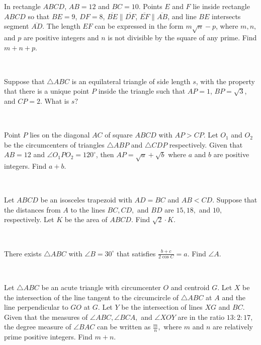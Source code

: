 \documentclass[mast]{lucky}
\begin{document}
\begin{req}[AIME I 2011/2]{2}
In rectangle $ABCD$, $AB=12$ and $BC=10$. Points $E$ and $F$ lie inside rectangle $ABCD$ so that $BE=9$, $DF=8$, $\overline{BE} \parallel \overline{DF}$, $\overline{EF} \parallel \overline{AB}$, and line $BE$ intersects segment $\overline{AD}$. The length $EF$ can be expressed in the form $m\sqrt{n}-p$, where $m,n,$ and $p$ are positive integers and $n$ is not divisible by the square of any prime. Find $m+n+p$.
\end{req}\\
\begin{prob}[AMC 12A 2020/24]{3}
Suppose that $\triangle ABC$ is an equilateral triangle of side length $s$, with the property that there is a unique point $P$ inside the triangle such that $AP = 1$, $BP = \sqrt{3}$, and $CP = 2$. What is $s?$
\end{prob}\\
\begin{prob}[AIME II 2011/13]{4}
Point $P$ lies on the diagonal $AC$ of square $ABCD$ with $AP>CP$. Let $O_1$ and $O_2$ be the circumcenters of triangles $\triangle ABP$ and $\triangle CDP$ respectively. Given that $AB=12$ and $\angle O_1 P O_2 = 120^\circ$, then $AP=\sqrt{a}+\sqrt{b}$ where $a$ and $b$ are positive integers. Find $a+b$.
\end{prob}\\
\begin{prob}[AIME I 2021/9]{4}
Let $ABCD$ be an isosceles trapezoid with $AD=BC$ and $AB<CD.$ Suppose that the distances from $A$ to the lines $BC,CD,$ and $BD$ are $15,18,$ and $10,$ respectively. Let $K$ be the area of $ABCD.$ Find $\sqrt2 \cdot K.$
\end{prob}\\
\begin{prob}[CMC 12A 2020/23]{4}
There exists $\triangle ABC$ with $\angle B = 30^{\circ}$ that satisfies $\frac{b+c}{2\cos C}=a$. Find $\angle A$.
\end{prob}\\
\begin{prob}[AIME II 2021/14]{6}
Let $\triangle ABC$ be an acute triangle with circumcenter $O$ and centroid $G$. Let $X$ be the intersection of the line tangent to the circumcircle of $\triangle ABC$ at $A$ and the line perpendicular to $GO$ at $G$. Let $Y$ be the intersection of lines $XG$ and $BC$. Given that the measures of $\angle ABC, \angle BCA, $ and $\angle XOY$ are in the ratio $13 : 2 : 17, $ the degree measure of $\angle BAC$ can be written as $\frac{m}{n},$ where $m$ and $n$ are relatively prime positive integers. Find $m+n$.
\end{prob}\\
\end{document}
